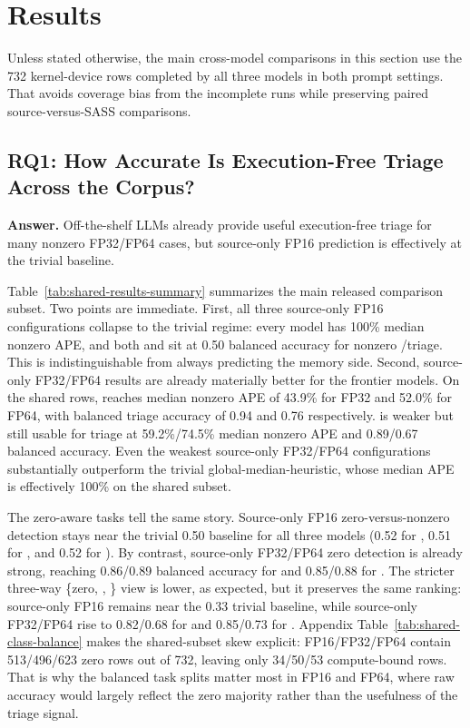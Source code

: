 \section{Results}
\label{sec:results}

Unless stated otherwise, the main cross-model comparisons in this section use the 732 kernel-device rows completed by all three models in both prompt settings.
That avoids coverage bias from the incomplete \gptoss runs while preserving paired source-versus-SASS comparisons.

\subsection{RQ1: How Accurate Is Execution-Free \rai Triage Across the Corpus?}

\textbf{Answer.}
Off-the-shelf LLMs already provide useful execution-free triage for many nonzero FP32/FP64 cases, but source-only FP16 prediction is effectively at the trivial baseline.



Table~\ref{tab:shared-results-summary} summarizes the main released comparison subset.
Two points are immediate.
First, all three source-only FP16 configurations collapse to the trivial regime: every model has 100\% median nonzero APE, and both \gptfivefour and \opus sit at 0.50 balanced accuracy for nonzero \bandwidthbound/\computebound triage.
This is indistinguishable from always predicting the memory side.
Second, source-only FP32/FP64 results are already materially better for the frontier models.
On the shared rows, \opus reaches median nonzero APE of 43.9\% for FP32 and 52.0\% for FP64, with balanced triage accuracy of 0.94 and 0.76 respectively.
\gptfivefour is weaker but still usable for triage at 59.2\%/74.5\% median nonzero APE and 0.89/0.67 balanced accuracy.
Even the weakest source-only FP32/FP64 configurations substantially outperform the trivial global-median-\rai heuristic, whose median APE is effectively 100\% on the shared subset.

The zero-aware tasks tell the same story.
Source-only FP16 zero-versus-nonzero detection stays near the trivial 0.50 baseline for all three models (0.52 for \gptfivefour, 0.51 for \gptoss, and 0.52 for \opus).
By contrast, source-only FP32/FP64 zero detection is already strong, reaching 0.86/0.89 balanced accuracy for \gptfivefour and 0.85/0.88 for \opus.
The stricter three-way \{zero, \bandwidthbound, \computebound\} view is lower, as expected, but it preserves the same ranking:
source-only FP16 remains near the 0.33 trivial baseline, while source-only FP32/FP64 rise to 0.82/0.68 for \gptfivefour and 0.85/0.73 for \opus.
Appendix Table~\ref{tab:shared-class-balance} makes the shared-subset skew explicit:
FP16/FP32/FP64 contain 513/496/623 zero rows out of 732, leaving only 34/50/53 compute-bound rows.
That is why the balanced task splits matter most in FP16 and FP64, where raw accuracy would largely reflect the zero majority rather than the usefulness of the triage signal.

